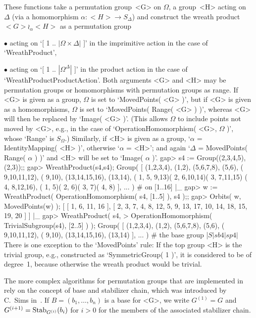 These functions  take  a permutation group~<G>  on $\Omega$,  a group~<H>
acting on $\Delta$  (via  a homomorphism $\alpha\colon  <H>\to S_\Delta$)
and   construct the wreath product   $<G>\wr_\alpha <H>$ as a permutation
group
\beginlist
  \item{$\bullet$} acting   on `[ 1 ..   $|\Omega\times\Delta|$ ]' in the
    imprimitive action in the case of `WreathProduct',
  \item{$\bullet$} acting on `[ 1  .. $|\Omega^\Delta|$ ]' in the product
    action in the case of `WreathProductProductAction'.
\endlist
Both  arguments <G>  and <H>  may be  permutation groups or homomorphisms
with permutation groups as range. If <G> is given as a group, $\Omega$ is
set  to `MovedPoints(  <G> )',  but if <G>   is given as a homomorphisms,
$\Omega$ is set to  `MovedPoints( Range( <G> )  )', whereas <G> will then
be replaced by  `Image( <G> )'.  (This allows $\Omega$  to include points
not moved  by <G>,  e.g.,  in  the case  of `OperationHomomorphism(  <G>,
$\Omega$ )', whose `Range' is $S_\Omega$.) Similarly,  if <H> is given as
a group, `$\alpha$ = IdentityMapping( <H> )', otherwise `$\alpha$ = <H>';
and again `$\Delta$ =  MovedPoints( Range( $\alpha$  ) )' and <H> will be
set to `Image( $\alpha$ )'.
\beginexample
    gap> s4 := Group((2,3,4,5),(2,3));;
    gap> WreathProduct(s4,s4);
    Group( [ (1,2,3,4), (1,2), (5,6,7,8), (5,6), ( 9,10,11,12), ( 9,10), 
      (13,14,15,16), (13,14), ( 1, 5, 9,13)( 2, 6,10,14)( 3, 7,11,15)
        ( 4, 8,12,16), ( 1, 5)( 2, 6)( 3, 7)( 4, 8) ], ... )  # on [1..16]
|_
    gap> w := WreathProduct( OperationHomomorphism( s4, [1..5] ), s4 );;
    gap> Orbits( w, MovedPoints(w) );
    [ [ 1, 6, 11, 16 ], 
      [ 2, 3, 7, 4, 8, 12, 5, 9, 13, 17, 10, 14, 18, 15, 19, 20 ] ]
|_
    gap> WreathProduct( s4,
    >        OperationHomomorphism( TrivialSubgroup(s4), [2..5] ) );
    Group( [ (1,2,3,4), (1,2), (5,6,7,8), (5,6), ( 9,10,11,12), ( 9,10), 
      (13,14,15,16), (13,14) ], ... )  # the base group |$S|sb4|sp4|$
\endexample
There is one exception to the `MovedPoints' rule: If the top group <H> is
the  trivial group, e.g.,  constructed  as `SymmetricGroup( 1  )',  it is
considered to be of degree~1, because otherwise  the wreath product would
be trivial.


The more complex algorithms  for permutation groups that  are implemented
in  {\GAP} rely on the concept  of base and  stabilizer  chain, which was
introduced by C.~Sims in~\cite{Sims70}. If   $B=(b_1, \ldots, b_n)$ is  a
base    for   <G>,   we    write    $G^{(1)}=G$   and     $G^{(i+1)}={\rm
Stab}_{G^{(i)}}(b_i)$   for $i>0$  for the   members   of the  associated
stabilizer chain.


